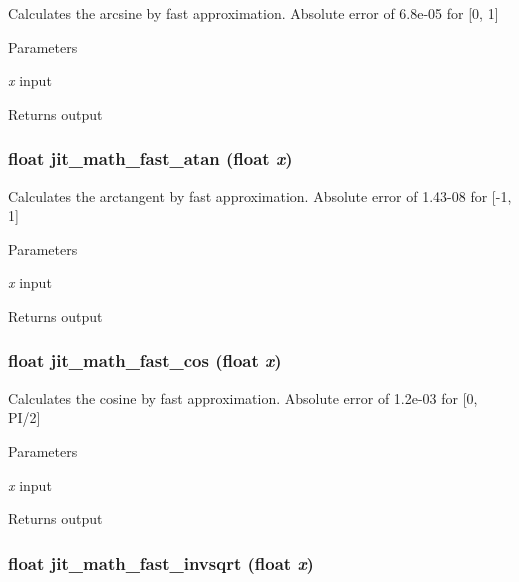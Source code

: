Calculates the arcsine by fast approximation. Absolute error of 6.8e-\/05 for \mbox{[}0, 1\mbox{]}


\begin{DoxyParams}{Parameters}
\item[{\em x}]input \end{DoxyParams}
\begin{DoxyReturn}{Returns}
output 
\end{DoxyReturn}
\hypertarget{group__mathmod_gaa95fba05813219b708f225c68d0130ed}{
\subsubsection[{jit\_\-math\_\-fast\_\-atan}]{\setlength{\rightskip}{0pt plus 5cm}float jit\_\-math\_\-fast\_\-atan (float {\em x})}}
\label{group__mathmod_gaa95fba05813219b708f225c68d0130ed}


Calculates the arctangent by fast approximation. Absolute error of 1.43-\/08 for \mbox{[}-\/1, 1\mbox{]}


\begin{DoxyParams}{Parameters}
\item[{\em x}]input \end{DoxyParams}
\begin{DoxyReturn}{Returns}
output 
\end{DoxyReturn}
\hypertarget{group__mathmod_ga3bd3eccee538a638fd6e16fef0556c9b}{
\subsubsection[{jit\_\-math\_\-fast\_\-cos}]{\setlength{\rightskip}{0pt plus 5cm}float jit\_\-math\_\-fast\_\-cos (float {\em x})}}
\label{group__mathmod_ga3bd3eccee538a638fd6e16fef0556c9b}


Calculates the cosine by fast approximation. Absolute error of 1.2e-\/03 for \mbox{[}0, PI/2\mbox{]}


\begin{DoxyParams}{Parameters}
\item[{\em x}]input \end{DoxyParams}
\begin{DoxyReturn}{Returns}
output 
\end{DoxyReturn}
\hypertarget{group__mathmod_gacbb43344ff2124157aa024dd4e2acc68}{
\subsubsection[{jit\_\-math\_\-fast\_\-invsqrt}]{\setlength{\rightskip}{0pt plus 5cm}float jit\_\-math\_\-fast\_\-invsqrt (float {\em x})}}
\label{group__mathmod_gacbb43344ff2124157aa024dd4e2acc68}


